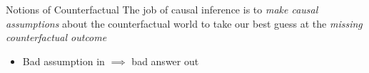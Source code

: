 \documentclass[aspectratio=169,t,11pt,table]{beamer}
\begin{document}
\begin{frame}{Notions of Counterfactual}
  The job of causal inference is to \emph{make \alert{causal assumptions}} about the counterfactual world to take our best guess at the \emph{missing counterfactual outcome}
  \begin{itemize}
    \item Bad assumption in $\implies$ bad answer out
  \end{itemize}

\end{frame}
\end{document}
